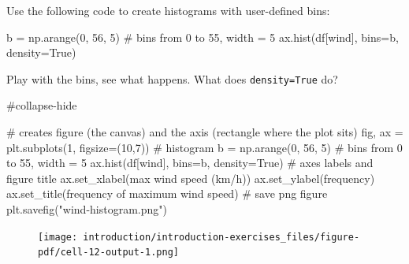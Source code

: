 \documentclass[
  letterpaper,
  DIV=11,
  numbers=noendperiod]{scrreprt}
\newenvironment{Shaded}{\begin{snugshade}}{\end{snugshade}}
\newcommand{\CommentTok}[1]{\textcolor[rgb]{0.37,0.37,0.37}{#1}}
\newcommand{\DecValTok}[1]{\textcolor[rgb]{0.68,0.00,0.00}{#1}}
\newcommand{\NormalTok}[1]{\textcolor[rgb]{0.00,0.23,0.31}{#1}}
\newcommand{\OperatorTok}[1]{\textcolor[rgb]{0.37,0.37,0.37}{#1}}
\newcommand{\StringTok}[1]{\textcolor[rgb]{0.13,0.47,0.30}{#1}}
\newcommand{\VariableTok}[1]{\textcolor[rgb]{0.07,0.07,0.07}{#1}}
\begin{document}
Use the following code to create histograms with user-defined bins:

\begin{Shaded}
\begin{Highlighting}[]
\NormalTok{b }\OperatorTok{=}\NormalTok{ np.arange(}\DecValTok{0}\NormalTok{, }\DecValTok{56}\NormalTok{, }\DecValTok{5}\NormalTok{)  }\CommentTok{\# bins from 0 to 55, width = 5}
\NormalTok{ax.hist(df[}\StringTok{\textquotesingle{}wind\textquotesingle{}}\NormalTok{], bins}\OperatorTok{=}\NormalTok{b, density}\OperatorTok{=}\VariableTok{True}\NormalTok{)}
\end{Highlighting}
\end{Shaded}

Play with the bins, see what happens. What does \texttt{density=True}
do?

\begin{Shaded}
\begin{Highlighting}[]
\CommentTok{\#collapse{-}hide}

\CommentTok{\# creates figure (the canvas) and the axis (rectangle where the plot sits)}
\NormalTok{fig, ax }\OperatorTok{=}\NormalTok{ plt.subplots(}\DecValTok{1}\NormalTok{, figsize}\OperatorTok{=}\NormalTok{(}\DecValTok{10}\NormalTok{,}\DecValTok{7}\NormalTok{))}
\CommentTok{\# histogram}
\NormalTok{b }\OperatorTok{=}\NormalTok{ np.arange(}\DecValTok{0}\NormalTok{, }\DecValTok{56}\NormalTok{, }\DecValTok{5}\NormalTok{)  }\CommentTok{\# bins from 0 to 55, width = 5}
\NormalTok{ax.hist(df[}\StringTok{\textquotesingle{}wind\textquotesingle{}}\NormalTok{], bins}\OperatorTok{=}\NormalTok{b, density}\OperatorTok{=}\VariableTok{True}\NormalTok{)}
\CommentTok{\# axes labels and figure title}
\NormalTok{ax.set\_xlabel(}\StringTok{\textquotesingle{}max wind speed (km/h)\textquotesingle{}}\NormalTok{)}
\NormalTok{ax.set\_ylabel(}\StringTok{\textquotesingle{}frequency\textquotesingle{}}\NormalTok{)}
\NormalTok{ax.set\_title(}\StringTok{\textquotesingle{}frequency of maximum wind speed\textquotesingle{}}\NormalTok{)}
\CommentTok{\# save png figure}
\NormalTok{plt.savefig(}\StringTok{"wind{-}histogram.png"}\NormalTok{)}
\end{Highlighting}
\end{Shaded}

\begin{figure}[H]

{\centering \texttt{[image: introduction/introduction-exercises\_files/figure-pdf/cell-12-output-1.png]}

}

\end{figure}
\end{document}
